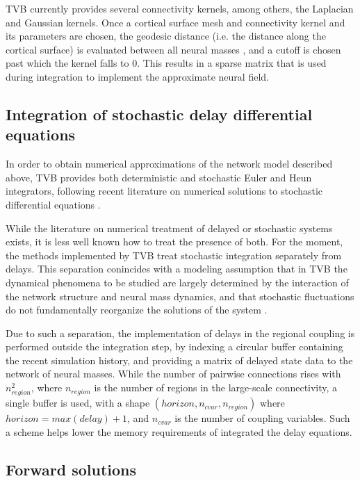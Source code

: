 	TVB currently provides several connectivity kernels, among others, 
	the Laplacian and Gaussian kernels. Once a cortical surface mesh 
	and connectivity kernel and its parameters are chosen, the geodesic
	distance (i.e. the distance along the cortical surface) is evaluated
	between all neural masses \cite{Mitchell1987}, and a cutoff is chosen
	past which the kernel falls to 0. This results in a sparse matrix that 
	is used during integration to implement the approximate neural field. 

\subsection{Integration of stochastic delay differential equations}

	In order to obtain numerical approximations of the network model 
	described above, TVB provides both deterministic and stochastic
	Euler and Heun integrators,
	following recent literature on numerical solutions to stochastic
	differential equations \cite{Kloeden_1995,Mannella_2002,Mannella_1989}.

	While the literature on numerical treatment of delayed or 
	stochastic systems exists, it is less well known how to treat 
	the presence of both. For the moment, the methods implemented by TVB
	treat stochastic integration separately from delays. 
	This separation conincides with a modeling assumption that in
	TVB the dynamical phenomena to be studied are largely determined
	by the interaction of the network structure and neural mass dynamics, 
	and that stochastic fluctuations do not fundamentally reorganize the
	solutions of the system \cite{Ghosh_2008,Deco_2009,Deco_2011,Deco_Senden_2012}.

	Due to such a separation, the implementation of delays in the
	regional coupling is performed outside the integration step,
	by indexing a circular buffer containing the recent simulation 
	history, and providing a matrix of delayed state data to the 
	network of neural masses. While the number of pairwise
	connections rises with $n_{region}^2$, where $n_{region}$ is
	the number of regions in the large-scale connectivity, 
	a single buffer is used, with a shape
	$(horizon, n_{cvar}, n_{region})$ where $horizon = max(delay) + 1$,
	and
	$n_{cvar}$ is the number of coupling variables. Such a scheme helps 
	lower the memory requirements of integrated the delay equations.

\subsection{Forward solutions}

